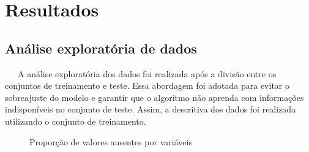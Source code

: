 \documentclass[
  12pt,
  a4paper,
]{scrreprt}
\begin{document}
\chapter{Resultados}\label{resultados}

\section{Análise exploratória de
dados}\label{anuxe1lise-exploratuxf3ria-de-dados-1}

~~~A análise exploratória dos dados foi realizada após a divisão entre
os conjuntos de treinamento e teste. Essa abordagem foi adotada para
evitar o sobreajuste do modelo e garantir que o algoritmo não aprenda
com informações indisponíveis no conjunto de teste. Assim, a descritiva
dos dados foi realizada utilizando o conjunto de treinamento.

\begin{figure}


\caption{\label{fig-miss}Proporção de valores ausentes por variáveis}

\end{figure}%
\end{document}
